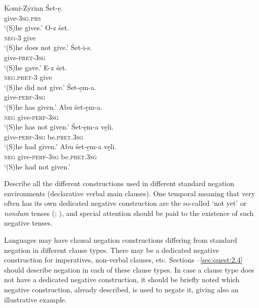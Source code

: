 \documentclass[output=paper,colorlinks,citecolor=brown]{langscibook}
\begin{document}
\ea\label{ex:quest:3} Komi-Zyrian \citep[105--109]{Rédei1978}
    \ea\label{ex:quest:3a}
        \gll Śet-e̮.\\ 
             give-\textsc{3sg.prs} \\
        \glt ‘(S)he gives.’ 
    \ex\label{ex:quest:3b}
        \gll O-z śet. \\
             \textsc{neg}{}-3 give \\
        \glt ‘(S)he does not give.’
     \ex\label{ex:quest:3c}
        \gll Śet-i-s. \\ 
             give-\textsc{pret-3sg} \\
        \glt ‘(S)he gave.’ 
    \ex\label{ex:quest:3d}
        \gll E-z śet. \\
             \textsc{neg.pret}{}-3 give\\
        \glt ‘(S)he did not give.’
    \ex\label{ex:quest:3e}
        \gll Śet-e̮m-a. \\ 
             give-\textsc{perf-3sg} \\
        \glt ‘(S)he has given.’ 
    \ex\label{ex:quest:3f}
        \gll Abu śet-e̮m-a. \\
             \textsc{neg} give-\textsc{perf-3sg}\\
        \glt ‘(S)he has not given.’
    \ex\label{ex:quest:3g}
        \gll Śet-e̮m-a ve̮li.\\ 
             give-\textsc{perf-3sg} be.\textsc{pret.3sg} \\
        \glt ‘(S)he had given.’ 
    \ex\label{ex:quest:3h}
        \gll Abu śet-e̮m-a ve̮li. \\
             \textsc{neg} give-\textsc{perf-3sg} be.\textsc{pret.3sg}\\
        \glt ‘(S)he had not given.’
    \z
\z  

Describe all the different constructions used in different standard negation environments (declarative verbal main clauses). One temporal meaning that very often has its own dedicated negative construction are the so-called ‘not yet’  or \textit{nondum} tenses (\citealt[54]{Comrie1985}; \citealt{Veselinova2017}), and special attention should be paid to the existence of such negative tenses. 

Languages may have clausal negation constructions differing from standard negation in different clause types. There may be a dedicated negative construction for imperatives, non-verbal clauses, etc. Sections --\ref{sec:quest:2.4} should describe negation in each of these clause types. In case a clause type does not have a dedicated negative construction, it should be briefly noted which negative construction, already described, is used to negate it, giving also an illustrative example.
\end{document}

